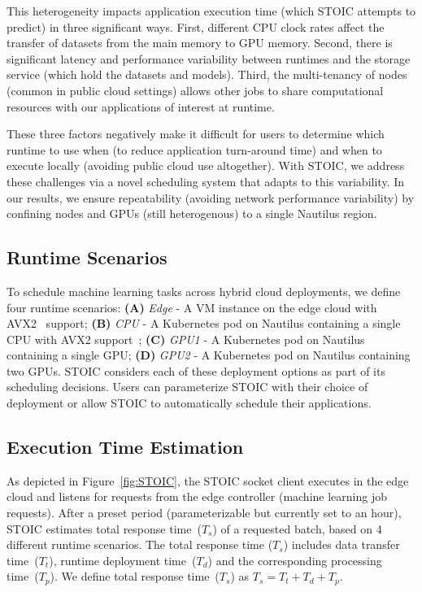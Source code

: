 This heterogeneity impacts application execution time (which STOIC attempts to
predict) in three significant ways. First, different CPU clock rates affect
the transfer of datasets from the main memory to GPU memory. Second, there is
significant latency and performance variability between runtimes and the storage
service (which hold the datasets and models). Third, the multi-tenancy of
nodes (common in public cloud settings) allows other jobs to share
computational resources with our applications of interest at runtime. 

These three factors negatively make it difficult for users to determine
which runtime to use when (to reduce application turn-around time) 
and when to execute locally (avoiding public 
cloud use altogether).  
With STOIC, we
address these challenges via a novel scheduling system that adapts to
this variability. In our results, we ensure repeatability (avoiding 
network performance variability)
by confining nodes and GPUs (still heterogenous) to a single Nautilus region.

\subsection{Runtime Scenarios}

To schedule machine learning tasks across hybrid cloud deployments, we define
four runtime scenarios: \textbf{(A)} \textit{Edge} - A VM instance on the edge
cloud with AVX2~\cite{ref:avx} support; \textbf{(B)} \textit{CPU} - A
Kubernetes pod on Nautilus containing a single CPU with AVX2 support~\cite{ref:avx};
\textbf{(C)} \textit{GPU1} - A Kubernetes pod on Nautilus containing
a single GPU; \textbf{(D)} \textit{GPU2} - A Kubernetes pod on Nautilus
containing two GPUs.  STOIC considers each of these deployment options as part
of its scheduling decisions. Users can parameterize STOIC with their choice of
deployment or allow STOIC to automatically schedule their applications.

\subsection{Execution Time Estimation}

As depicted in Figure~\ref{fig:STOIC}, the STOIC socket client executes in the
edge cloud and listens for requests from the edge controller (machine learning
job requests). After a preset period (parameterizable but currently set to an
hour), STOIC estimates total response time~($T_s$) of a requested batch, based
on 4 different runtime scenarios. The total response time ($T_s$) includes
data transfer time~($T_t$), runtime deployment time~($T_d$) and the
corresponding processing time~($T_p$). We define total response time~($T_s$)
as $T_s = T_t + T_d + T_p$.
 
